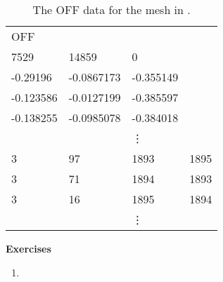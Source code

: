\begin{table}[h!]
\caption{The OFF data for the mesh in .}
\centering
\begin{tabular}{|p{2cm} p{2cm} p{2cm} p{2cm}|} 
 \hline
OFF &  & &  \\ 
7529 & 14859 & 0 &  \\ 
-0.29196 & -0.0867173 & -0.355149  &  \\
 -0.123586   & -0.0127199 & -0.385597 &  \\
-0.138255   & -0.0985078 & -0.384018 &  \\
  & &\vdots &  \\  
 3&  97 &1893& 1895\\
 3& 71 & 1894 & 1893 \\
 3 & 16 & 1895 & 1894\\
   & &\vdots &  \\  
 \hline
\end{tabular}

\label{tab:off}
\end{table}


\noindent \textbf{Exercises}


\begin{enumerate}
	\item 
	
\end{enumerate}

\pagebreak